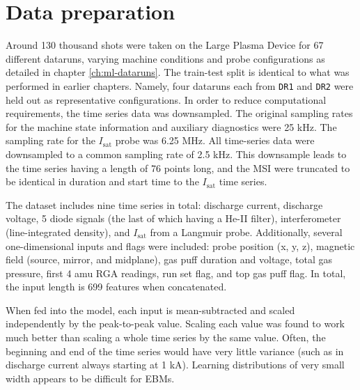 

\section{Data preparation}

Around 130 thousand shots were taken on the Large Plasma Device for 67 different dataruns, varying machine conditions and probe configurations as detailed in chapter \ref{ch:ml-dataruns}. The train-test split is identical to what was performed in earlier chapters. Namely, four dataruns each from \texttt{DR1} and \texttt{DR2} were held out as representative configurations. In order to reduce computational requirements, the time series data was downsampled. The original sampling rates for the machine state information and auxiliary diagnostics were 25 kHz. The sampling rate for the $I_\text{sat}$ probe was 6.25 MHz. All time-series data were downsampled to a common sampling rate of 2.5 kHz. This downsample leads to the time series having a length of 76 points long, and the MSI were truncated to be identical in duration and start time to the $I_\text{sat}$ time series.

The dataset includes nine time series in total: discharge current, discharge voltage, 5 diode signals (the last of which having a He-II filter), interferometer (line-integrated density), and $I_\text{sat}$ from a Langmuir probe. Additionally, several one-dimensional inputs and flags were included: probe position (x, y, z), magnetic field (source, mirror, and midplane), gas puff duration and voltage, total gas pressure, first 4 amu RGA readings, run set flag, and top gas puff flag. In total, the input length is 699 features when concatenated. 

When fed into the model, each input is mean-subtracted and scaled independently by the peak-to-peak value. Scaling each value was found to work much better than scaling a whole time series by the same value. Often, the beginning and end of the time series would have very little variance (such as in discharge current always starting at 1 kA). Learning distributions of very small width appears to be difficult for EBMs. 


